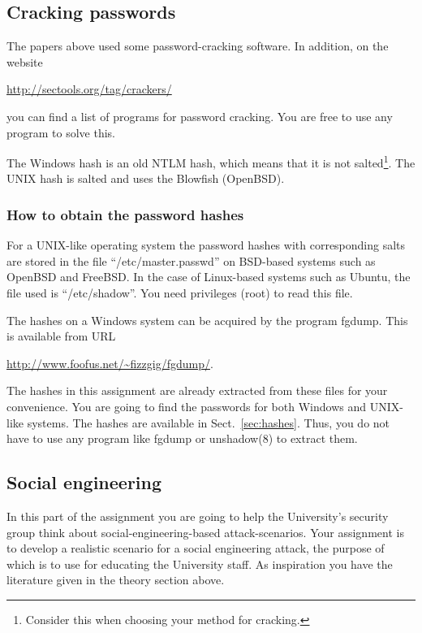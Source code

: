 \subsection{Cracking passwords}

The papers above used some password-cracking software.
In addition, on the website
\begin{center}
  \url{http://sectools.org/tag/crackers/}
\end{center}
you can find a list of programs for password cracking.
You are free to use any program to solve this.

The Windows hash is an old NTLM hash, which means that it is not 
salted\footnote{%
  Consider this when choosing your method for cracking.
}.
The UNIX hash is salted and uses the Blowfish (OpenBSD).

\subsubsection{How to obtain the password hashes}

For a UNIX-like operating system the password hashes with corresponding salts 
are stored in the file \enquote{/etc/master.passwd} on BSD-based systems such 
as OpenBSD and FreeBSD\@.
In the case of Linux-based systems such as Ubuntu, the file used is 
\enquote{/etc/shadow}.
You need privileges (root) to read this file.

The hashes on a Windows system can be acquired by the program fgdump.
This is available from URL
\begin{center}
  \url{http://www.foofus.net/~fizzgig/fgdump/}.
\end{center}

The hashes in this assignment are already extracted from these files for your 
convenience.
You are going to find the passwords for both Windows and UNIX-like systems.
The hashes are available in Sect.~\ref{sec:hashes}.
Thus, you do not have to use any program like fgdump or unshadow(8) to extract 
them.

\subsection{Social engineering}

In this part of the assignment you are going to help the University's security 
group think about social-engineering-based attack-scenarios.
Your assignment is to develop a realistic scenario for a social engineering 
attack, the purpose of which is to use for educating the University staff.
As inspiration you have the literature given in the theory section above.

